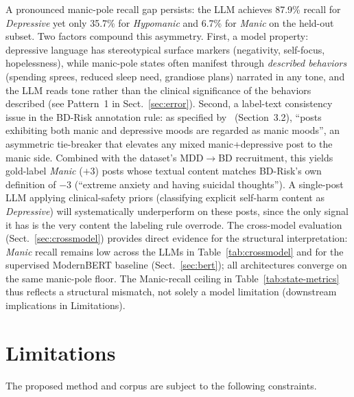 \documentclass[runningheads]{llncs}
\begin{document}
A pronounced manic-pole recall gap persists: the LLM achieves 87.9\% recall for \emph{Depressive} yet only 35.7\% for \emph{Hypomanic} and 6.7\% for \emph{Manic} on the held-out subset. Two factors compound this asymmetry. First, a model property: depressive language has stereotypical surface markers (negativity, self-focus, hopelessness), while manic-pole states often manifest through \emph{described behaviors} (spending sprees, reduced sleep need, grandiose plans) narrated in any tone, and the LLM reads tone rather than the clinical significance of the behaviors described (see Pattern~1 in Sect.~\ref{sec:error}). Second, a  label-text consistency issue in the BD-Risk annotation rule: as specified by~\cite{lee2024detecting} (Section~3.2), ``posts exhibiting both manic and depressive moods are regarded as manic moods'', an asymmetric tie-breaker that elevates any mixed manic+depressive post to the manic side. Combined with the dataset's MDD$\rightarrow$BD recruitment, this yields gold-label \emph{Manic} ($+3$) posts whose textual content matches BD-Risk's own definition of $-3$ (``extreme anxiety and having suicidal thoughts''). A single-post LLM applying clinical-safety priors (classifying explicit self-harm content as \emph{Depressive}) will systematically underperform on these posts, since the only signal it has is the very content the labeling rule overrode. The cross-model evaluation (Sect.~\ref{sec:crossmodel}) provides direct evidence for the structural interpretation: \emph{Manic} recall remains low across the LLMs in Table~\ref{tab:crossmodel} and for the supervised ModernBERT baseline (Sect.~\ref{sec:bert}); all architectures converge on the same manic-pole floor. The Manic-recall ceiling in Table~\ref{tab:state-metrics} thus reflects a structural mismatch, not solely a model limitation (downstream implications in Limitations).

\section{Limitations}

The proposed method and corpus are subject to the following constraints.
\end{document}

